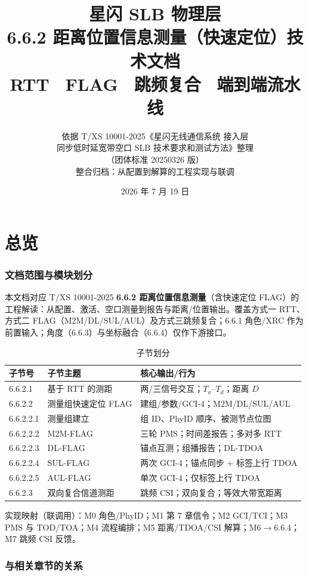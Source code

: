 \documentclass[11pt,a4paper]{ctexart}
\title{%
  \textbf{星闪 SLB 物理层}\\[0.4em]
  \Large 6.6.2 距离位置信息测量（快速定位）技术文档\\[0.3em]
  \large RTT \textbullet\ FLAG \textbullet\ 跳频复合 \textbullet\ 端到端流水线
}
\author{依据 T/XS 10001-2025《星闪无线通信系统 接入层\\
同步低时延宽带空口 SLB 技术要求和测试方法》整理\\
（团体标准 20250326 版）\\[0.3em]
整合归档：从配置到解算的工程实现与联调}
\date{2026 年 7 月 19 日}
\begin{document}
\maketitle
\tableofcontents
\newpage

\part{总览}

\section{文档范围与模块划分}

本文档对应 T/XS 10001-2025 \textbf{6.6.2 距离位置信息测量}（含快速定位 FLAG）的工程解读：从配置、激活、空口测量到报告与距离/位置输出。覆盖方式一 RTT、方式二 FLAG（M2M/DL/SUL/AUL）及方式三跳频复合；6.6.1 角色/XRC 作为前置输入；角度（6.6.3）与坐标融合（6.6.4）仅作下游接口。

\begin{table}[h]
\centering
\small
\caption{子节划分}
\begin{tabular}{lll}
\toprule
\textbf{子节号} & \textbf{子节主题} & \textbf{核心输出/行为} \\
\midrule
6.6.2.1 & 基于 RTT 的测距 & 两/三信号交互；$T_a$--$T_d$；距离 $D$ \\
6.6.2.2 & 测量组快速定位 FLAG & 建组/参数/GCI-4；M2M/DL/SUL/AUL \\
6.6.2.2.1 & 测量组建立 & 组 ID、PhyID 顺序、被测节点位图 \\
6.6.2.2.2 & M2M-FLAG & 三轮 PMS；时间差报告；多对多 RTT \\
6.6.2.2.3 & DL-FLAG & 锚点互测；组播报告；DL-TDOA \\
6.6.2.2.4 & SUL-FLAG & 两次 GCI-4；锚点同步 + 标签上行 TDOA \\
6.6.2.2.5 & AUL-FLAG & 单次 GCI-4；仅标签上行 TDOA \\
6.6.2.3 & 双向复合信道测距 & 跳频 CSI；双向复合；等效大带宽距离 \\
\bottomrule
\end{tabular}
\end{table}

实现映射（联调用）：M0 角色/PhyID；M1 第 7 章信令；M2 GCI/TCI；M3 PMS 与 TOD/TOA；M4 流程编排；M5 距离/TDOA/CSI 解算；M6$\rightarrow$6.6.4；M7 跳频 CSI 反馈。

\section{与相关章节的关系}
\end{document}
